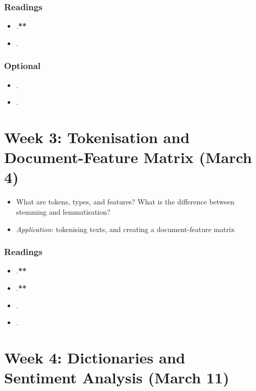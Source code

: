 \documentclass[abstract=on,parskip=full,headings=standardclasses,fontsize=11pt,paper=a4]{scrartcl}
\begin{document}
\subsubsection*{Readings}
\begin{itemize}
\item {}.\textbf{**}
\item {}.
\end{itemize}


\subsubsection*{Optional}
\begin{itemize}
\item {}.
\item {}.
\end{itemize}

\section{Week 3:  Tokenisation and Document-Feature Matrix (March 4)}

\begin{itemize}
\renewcommand\labelitemi{--}
\item What are tokens, types, and features? What is the difference between stemming and lemmatisation?
\item \textit{Application}: tokenising texts, and creating a document-feature matrix
\end{itemize}

\subsubsection*{Readings}
\begin{itemize}
 \item {}.\textbf{**}
  \item {}.\textbf{**}
 \item {}.
 \item {}.
\end{itemize}
 
  
\section{Week 4: Dictionaries and Sentiment Analysis (March 11)}
\end{document}
